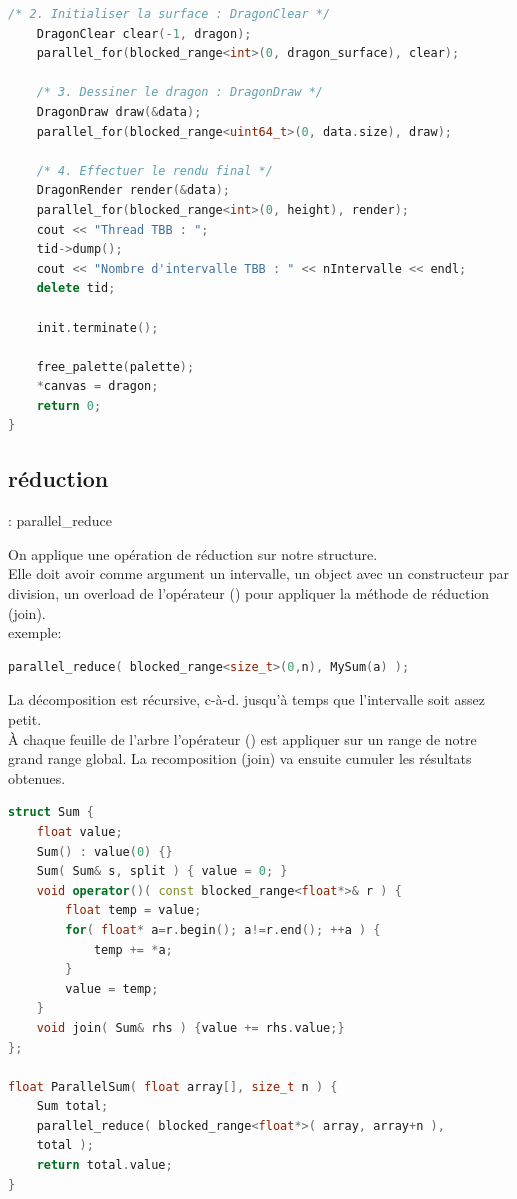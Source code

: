 \documentclass[oneside]{book}
\begin{document}
\begin{lstlisting}[language=c++]
	/* 2. Initialiser la surface : DragonClear */
	DragonClear clear(-1, dragon);
	parallel_for(blocked_range<int>(0, dragon_surface), clear);

	/* 3. Dessiner le dragon : DragonDraw */
	DragonDraw draw(&data);
	parallel_for(blocked_range<uint64_t>(0, data.size), draw);

	/* 4. Effectuer le rendu final */
	DragonRender render(&data);
	parallel_for(blocked_range<int>(0, height), render);
	cout << "Thread TBB : ";
	tid->dump();
	cout << "Nombre d'intervalle TBB : " << nIntervalle << endl;
	delete tid;
	
	init.terminate();

	free_palette(palette);
	*canvas = dragon;
	return 0;
}
\end{lstlisting}

\subsection{réduction} : parallel\_reduce

On applique une opération de réduction sur notre structure.\\

Elle doit avoir comme argument un intervalle, un object avec un constructeur par division, un overload de l'opérateur () pour appliquer la méthode de réduction (join).\\

exemple:

\begin{lstlisting}[language=c++]
parallel_reduce( blocked_range<size_t>(0,n), MySum(a) );
\end{lstlisting}

La décomposition est récursive, c-à-d. jusqu'à temps que l'intervalle soit assez petit. \\

À chaque feuille de l'arbre l'opérateur () est appliquer sur un range de notre grand range global. La recomposition (join) va ensuite cumuler les résultats obtenues.

\begin{lstlisting}[language=c++]
struct Sum {
	float value;
	Sum() : value(0) {}
	Sum( Sum& s, split ) { value = 0; }
	void operator()( const blocked_range<float*>& r ) {
		float temp = value;
		for( float* a=r.begin(); a!=r.end(); ++a ) {
			temp += *a;
		}
		value = temp;
	}
	void join( Sum& rhs ) {value += rhs.value;}
};

float ParallelSum( float array[], size_t n ) {
	Sum total;
	parallel_reduce( blocked_range<float*>( array, array+n ),
	total );
	return total.value;
}
\end{lstlisting}
\end{document}
